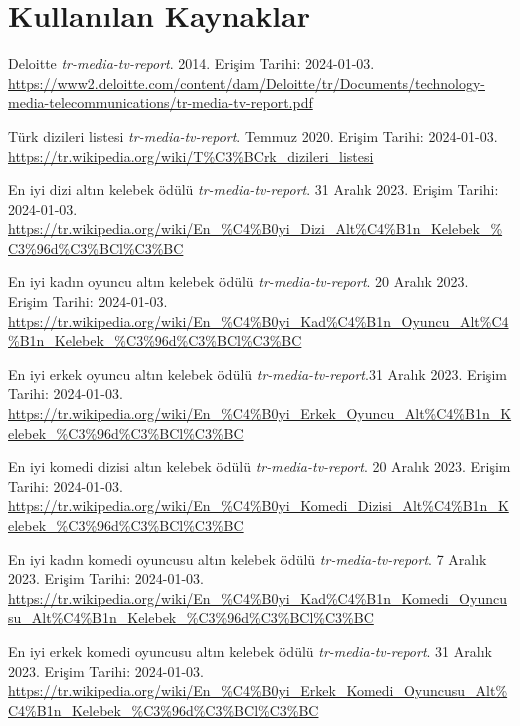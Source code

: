 \section{Kullanılan Kaynaklar}

\begingroup
\raggedright
\begin{thebibliography}{}

Deloitte \textit{tr-media-tv-report}. 2014. Erişim Tarihi: 2024-01-03. \\
\url{https://www2.deloitte.com/content/dam/Deloitte/tr/Documents/technology-media-telecommunications/tr-media-tv-report.pdf}

Türk dizileri listesi \textit{tr-media-tv-report}. Temmuz 2020. Erişim Tarihi: 2024-01-03. \\
\url{https://tr.wikipedia.org/wiki/T%C3%BCrk_dizileri_listesi}

En iyi dizi altın kelebek ödülü \textit{tr-media-tv-report}. 31 Aralık 2023. Erişim Tarihi: 2024-01-03. \\
\url{https://tr.wikipedia.org/wiki/En_%C4%B0yi_Dizi_Alt%C4%B1n_Kelebek_%C3%96d%C3%BCl%C3%BC}

En iyi kadın oyuncu altın kelebek ödülü \textit{tr-media-tv-report}. 20 Aralık 2023. Erişim Tarihi: 2024-01-03. \\
\url{https://tr.wikipedia.org/wiki/En_%C4%B0yi_Kad%C4%B1n_Oyuncu_Alt%C4%B1n_Kelebek_%C3%96d%C3%BCl%C3%BC}

En iyi erkek oyuncu altın kelebek ödülü \textit{tr-media-tv-report}.31 Aralık 2023. Erişim Tarihi: 2024-01-03. \\
\url{https://tr.wikipedia.org/wiki/En_%C4%B0yi_Erkek_Oyuncu_Alt%C4%B1n_Kelebek_%C3%96d%C3%BCl%C3%BC}

En iyi komedi dizisi altın kelebek ödülü \textit{tr-media-tv-report}. 20 Aralık 2023. Erişim Tarihi: 2024-01-03. \\
\url{https://tr.wikipedia.org/wiki/En_%C4%B0yi_Komedi_Dizisi_Alt%C4%B1n_Kelebek_%C3%96d%C3%BCl%C3%BC}

En iyi kadın komedi oyuncusu altın kelebek ödülü \textit{tr-media-tv-report}. 7 Aralık 2023. Erişim Tarihi: 2024-01-03. \\
\url{https://tr.wikipedia.org/wiki/En_%C4%B0yi_Kad%C4%B1n_Komedi_Oyuncusu_Alt%C4%B1n_Kelebek_%C3%96d%C3%BCl%C3%BC}

En iyi erkek komedi oyuncusu altın kelebek ödülü \textit{tr-media-tv-report}. 31 Aralık 2023. Erişim Tarihi: 2024-01-03. \\
\url{https://tr.wikipedia.org/wiki/En_%C4%B0yi_Erkek_Komedi_Oyuncusu_Alt%C4%B1n_Kelebek_%C3%96d%C3%BCl%C3%BC}


\end{thebibliography}
